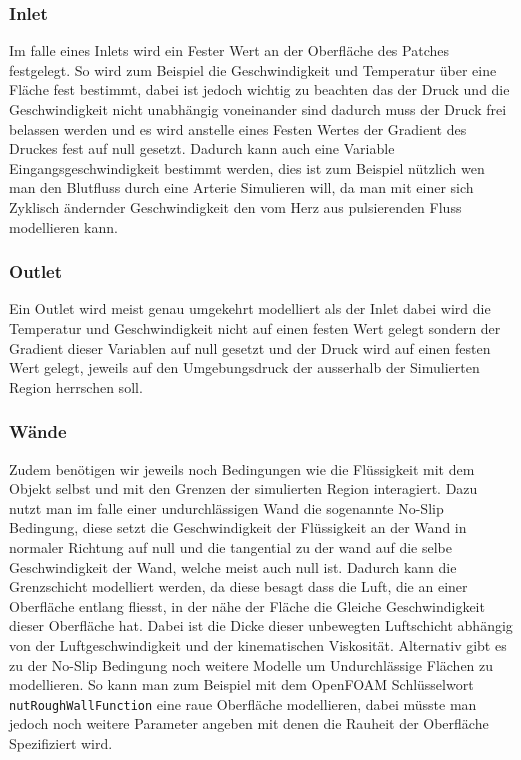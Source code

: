 \subsubsection{Inlet}
Im falle eines Inlets wird ein Fester Wert an der Oberfläche des Patches festgelegt. So wird zum Beispiel die Geschwindigkeit und Temperatur über eine Fläche fest bestimmt, dabei ist jedoch wichtig zu beachten das der Druck und die Geschwindigkeit nicht unabhängig voneinander sind dadurch muss der Druck frei belassen werden und es wird anstelle eines Festen Wertes der Gradient des Druckes fest auf null gesetzt. 
Dadurch kann auch eine Variable Eingangsgeschwindigkeit bestimmt werden, dies ist zum Beispiel nützlich wen man den Blutfluss durch eine Arterie Simulieren will, da man mit einer sich Zyklisch ändernder Geschwindigkeit den vom Herz aus pulsierenden Fluss modellieren kann.

\subsubsection{Outlet}
Ein Outlet wird meist genau umgekehrt modelliert als der Inlet dabei wird die Temperatur und Geschwindigkeit nicht auf einen festen Wert gelegt sondern der Gradient dieser Variablen auf null gesetzt und der Druck wird auf einen festen Wert gelegt, jeweils auf den Umgebungsdruck der ausserhalb der Simulierten Region herrschen soll.

\subsubsection{Wände}
Zudem benötigen wir jeweils noch Bedingungen wie die Flüssigkeit mit dem Objekt selbst und mit den Grenzen der simulierten Region interagiert.
Dazu nutzt man im falle einer undurchlässigen Wand die sogenannte No-Slip Bedingung, diese setzt die Geschwindigkeit der Flüssigkeit an der Wand in normaler Richtung auf null und die tangential zu der wand auf die selbe Geschwindigkeit der Wand, welche meist auch null ist. 
Dadurch kann die Grenzschicht modelliert werden, da diese besagt dass die Luft, die an einer Oberfläche entlang fliesst, in der nähe der Fläche die Gleiche Geschwindigkeit dieser Oberfläche hat.
Dabei ist die Dicke dieser unbewegten Luftschicht abhängig von der Luftgeschwindigkeit und der kinematischen Viskosität.
Alternativ gibt es zu der No-Slip Bedingung noch weitere Modelle um Undurchlässige Flächen zu modellieren.
So kann man zum Beispiel mit dem OpenFOAM Schlüsselwort \texttt{nutRoughWallFunction} eine raue Oberfläche modellieren, dabei müsste man jedoch noch weitere Parameter angeben mit denen die Rauheit der Oberfläche Spezifiziert wird.

